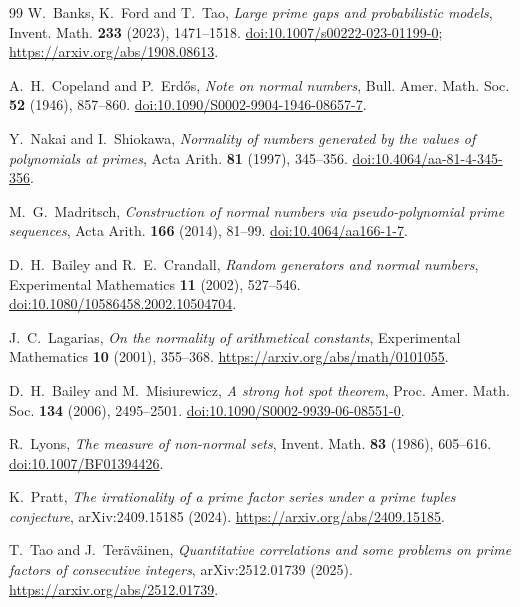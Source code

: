 \documentclass[11pt,a4paper]{article}
\begin{document}
\begin{thebibliography}{99}
W.~Banks, K.~Ford and T.~Tao, \emph{Large prime gaps and probabilistic
models}, Invent. Math. \textbf{233} (2023), 1471--1518.
\href{https://doi.org/10.1007/s00222-023-01199-0}{doi:10.1007/s00222-023-01199-0};
\url{https://arxiv.org/abs/1908.08613}.

A.~H.~Copeland and P.~Erd\H os, \emph{Note on normal numbers},
Bull. Amer. Math. Soc. \textbf{52} (1946), 857--860.
\href{https://doi.org/10.1090/S0002-9904-1946-08657-7}{doi:10.1090/S0002-9904-1946-08657-7}.

Y.~Nakai and I.~Shiokawa, \emph{Normality of numbers generated by the values
of polynomials at primes}, Acta Arith. \textbf{81} (1997), 345--356.
\href{https://doi.org/10.4064/aa-81-4-345-356}{doi:10.4064/aa-81-4-345-356}.

M.~G.~Madritsch, \emph{Construction of normal numbers via
pseudo-polynomial prime sequences}, Acta Arith. \textbf{166} (2014), 81--99.
\href{https://doi.org/10.4064/aa166-1-7}{doi:10.4064/aa166-1-7}.

D.~H.~Bailey and R.~E.~Crandall, \emph{Random generators and normal
numbers}, Experimental Mathematics \textbf{11} (2002), 527--546.
\href{https://doi.org/10.1080/10586458.2002.10504704}{doi:10.1080/10586458.2002.10504704}.

J.~C.~Lagarias, \emph{On the normality of arithmetical constants},
Experimental Mathematics \textbf{10} (2001), 355--368.
\url{https://arxiv.org/abs/math/0101055}.

D.~H.~Bailey and M.~Misiurewicz, \emph{A strong hot spot theorem},
Proc. Amer. Math. Soc. \textbf{134} (2006), 2495--2501.
\href{https://doi.org/10.1090/S0002-9939-06-08551-0}{doi:10.1090/S0002-9939-06-08551-0}.

R.~Lyons, \emph{The measure of non-normal sets}, Invent. Math.
\textbf{83} (1986), 605--616.
\href{https://doi.org/10.1007/BF01394426}{doi:10.1007/BF01394426}.

K.~Pratt, \emph{The irrationality of a prime factor series under a
prime tuples conjecture}, arXiv:2409.15185 (2024).
\url{https://arxiv.org/abs/2409.15185}.

T.~Tao and J.~Ter\"av\"ainen, \emph{Quantitative correlations and some
problems on prime factors of consecutive integers},
arXiv:2512.01739 (2025).
\url{https://arxiv.org/abs/2512.01739}.


\end{thebibliography}
\end{document}
